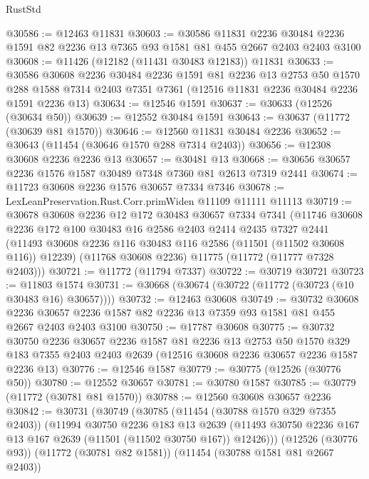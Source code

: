 \begin{lexlean}{RustStd}
\begin{coremodule}
@30586 := @12463 @11831
@30603 := @30586
    @11831
    @2236
    @30484
    @2236
    @1591
    @82
    @2236
    @13
    @7365
    @93
    @1581
    @81
    @455
    @2667
    @2403
    @2403
    @3100
@30608 := @11426 (@12182 (@11431 @30483 @12183)) @11831
@30633 := @30586
    @30608
    @2236
    @30484
    @2236
    @1591
    @81
    @2236
    @13
    @2753
    @50
    @1570
    @288
    @1588
    @7314
    @2403
    @7351
    @7361
    (@12516 @11831 @2236 @30484 @2236 @1591 @2236 @13)
@30634 := @12546 @1591
@30637 := @30633 (@12526 (@30634 @50))
@30639 := @12552 @30484 @1591
@30643 := @30637 (@11772 (@30639 @81 @1570))
@30646 := @12560 @11831 @30484 @2236
@30652 := @30643 (@11454 (@30646 @1570 @288 @7314 @2403))
@30656 := @12308 @30608 @2236 @2236 @13
@30657 := @30481 @13
@30668 := @30656 @30657 @2236 @1576 @1587 @30489 @7348 @7360 @81 @2613 @7319 @2441
@30674 := @11723 @30608 @2236 @1576 @30657 @7334 @7346
@30678 := LexLeanPreservation.Rust.Corr.primWiden @11109 @11111 @11113
@30719 := @30678
    @30608
    @2236
    @12
    @172
    @30483
    @30657
    @7334
    @7341
    (@11746
      @30608
      @2236
      @172
      @100
      @30483
      @16
      @2586
      @2403
      @2414
      @2435
      @7327
      @2441
      (@11493 @30608 @2236 @116 @30483 @116 @2586 (@11501 (@11502 @30608 @116)) @12239)
      (@11768 @30608 @2236)
      @11775
      (@11772 (@11777 @7328 @2403)))
@30721 := @11772 (@11794 @7337)
@30722 := @30719 @30721
@30723 := @11803 @1574
@30731 := @30668 (@30674 (@30722 (@11772 (@30723 (@10 @30483 @16) @30657))))
@30732 := @12463 @30608
@30749 := @30732
    @30608
    @2236
    @30657
    @2236
    @1587
    @82
    @2236
    @13
    @7359
    @93
    @1581
    @81
    @455
    @2667
    @2403
    @2403
    @3100
@30750 := @17787 @30608
@30775 := @30732
    @30750
    @2236
    @30657
    @2236
    @1587
    @81
    @2236
    @13
    @2753
    @50
    @1570
    @329
    @183
    @7355
    @2403
    @2403
    @2639
    (@12516 @30608 @2236 @30657 @2236 @1587 @2236 @13)
@30776 := @12546 @1587
@30779 := @30775 (@12526 (@30776 @50))
@30780 := @12552 @30657
@30781 := @30780 @1587
@30785 := @30779 (@11772 (@30781 @81 @1570))
@30788 := @12560 @30608 @30657 @2236
@30842 := @30731
    (@30749
      (@30785
        (@11454 (@30788 @1570 @329 @7355 @2403))
        (@11994
          @30750
          @2236
          @183
          @13
          @2639
          (@11493 @30750 @2236 @167 @13 @167 @2639 (@11501 (@11502 @30750 @167)) @12426)))
      (@12526 (@30776 @93))
      (@11772 (@30781 @82 @1581))
      (@11454 (@30788 @1581 @81 @2667 @2403))

\end{coremodule}
\end{lexlean}
